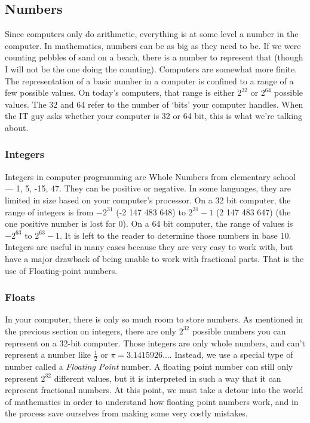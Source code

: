 \subsection{Numbers}

Since computers only do arithmetic, everything is at some level a number in
the computer. In mathematics, numbers can be as big as they need to be. If we
were counting pebbles of sand on a beach, there is a number to represent that
(though I will not be the one doing the counting). Computers are somewhat more
finite. The representation of a basic number in a computer is confined to a
range of a few possible values. On today's computers, that range is either
$2^32$ or $2^64$ possible values. The 32 and 64 refer to the number of `bits'
your computer handles. When the IT guy asks whether your computer is 32 or 64
bit, this is what we're talking about.

\subsubsection{Integers}

Integers in computer programming are Whole Numbers from elementary school ---
1, 5, -15, 47. They can be positive or negative. In some languages, they are
limited in size based on your computer's processor. On a 32 bit computer, the
range of integers is from $-2^{31}$ (-2 147 483 648) to $2^{31}-1$ (2 147 483
647) (the one positive number is lost for 0). On a 64 bit computer, the range
of values is $-2^{63}$ to $2^{63}-1$. It is left to the reader to determine
those numbers in base 10. Integers are useful in many cases because they are
very easy to work with, but have a major drawback of being unable to work with
fractional parts. That is the use of Floating-point numbers.

\subsubsection{Floats}

In your computer, there is only so much room to store numbers. As mentioned in
the previous section on integers, there are only $2^32$ possible numbers you
can represent on a 32-bit computer. Those integers are only whole numbers, and
can't represent a number like $\frac{1}{2}$ or $\pi = 3.1415926...$. Instead,
we use a special type of number called a {\em Floating Point} number. A
floating point number can still only represent $2^32$ different values, but it
is interpreted in such a way that it can represent fractional numbers. At this
point, we must take a detour into the world of mathematics in order to
understand how floating point numbers work, and in the process save ourselves
from making some very costly mistakes.

